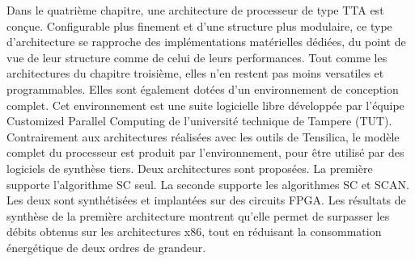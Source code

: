 Dans le quatrième chapitre, une architecture de processeur de type TTA est conçue. Configurable plus finement et d'une structure plus modulaire, ce type d'architecture se rapproche des implémentations matérielles dédiées, du point de vue de leur structure comme de celui de leurs performances. Tout comme les architectures du chapitre troisième, elles n'en restent pas moins versatiles et programmables. Elles sont également dotées d'un environnement de conception complet. Cet environnement est une suite logicielle libre développée par l'équipe \og Customized Parallel Computing \fg de l'université technique de Tampere (TUT). Contrairement aux architectures réalisées avec les outils de Tensilica, le modèle complet du processeur est produit par l'environnement, pour être utilisé par des logiciels de synthèse tiers. Deux architectures sont proposées. La première supporte l'algorithme SC seul. La seconde supporte les algorithmes SC et SCAN. Les deux sont synthétisées et implantées sur des circuits FPGA. Les résultats de synthèse de la première architecture montrent qu'elle permet de surpasser les débits obtenus sur les architectures x86, tout en réduisant la consommation énergétique de deux ordres de grandeur.

